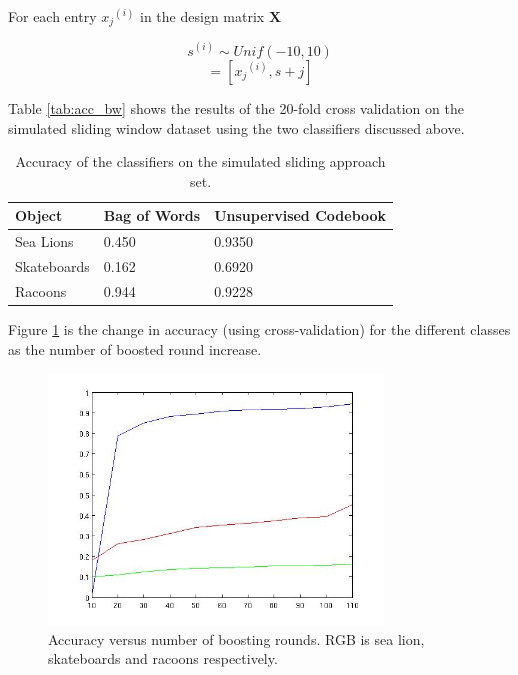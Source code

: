 \documentclass[10pt,twocolumn,letterpaper]{article}
\begin{document}
For each entry \begin{math} {x_j}^{(i)} \end{math} in the design matrix \begin{math} \boldsymbol{X} \end{math}

\[ s^{(i)} \sim Unif(-10,10) \]
\begin{equation} 
    [row^{(i)} ,  col^{(i)}] = [ {x_j}^{(i)}  , s + j] 
    \label{eq:fv}
\end{equation}

Table \ref{tab:acc_bw} shows the results of the 20-fold cross validation on the simulated sliding window
dataset using the two classifiers discussed above.
 
 \begin{table}
   \begin{center}
    \begin{tabular}{ | l | l | l | }
    \hline
    \textbf{Object} & \textbf{Bag of Words} & \textbf{Unsupervised Codebook}  \\ \hline
    Sea Lions & 0.450 & 0.9350 \\ \hline
    Skateboards & 0.162 & 0.6920 \\ \hline
    Racoons & 0.944 & 0.9228 \\ \hline
    \end{tabular}
    \caption{Accuracy of the classifiers on the simulated sliding approach set.}
    \label{tab:desc}
    \end{center}
  \end{table}
 
Figure \ref{fig:boost_rounds} is the change in accuracy (using cross-validation) for the different classes 
as the number of boosted round increase.

\begin{figure}[t]
    \includegraphics[width=3.5in]{boosting_rounds.jpg}
   \caption{Accuracy versus number of boosting rounds. RGB is sea lion, skateboards and racoons respectively.}
   \label{fig:boost_rounds}
\end{figure}
\end{document}
